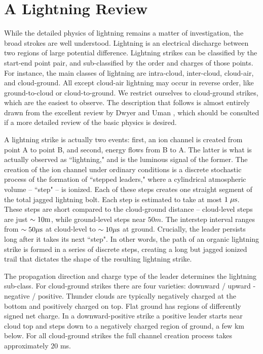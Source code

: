 \documentclass[%
 reprint,
 amsmath,amssymb,
 aps,
]{revtex4-2}
\begin{document}


\section{A Lightning Review} %
\label{sec:a_lightning_review}

    While the detailed physics of lightning remains a matter of investigation, the broad strokes are well understood. Lightning is an electrical discharge between two regions of large potential difference. Lightning strikes can be classified by the start-end point pair, and sub-classified by the order and charges of those points. For instance, the main classes of lightning are intra-cloud, inter-cloud, cloud-air, and cloud-ground. All except cloud-air lightning may occur in reverse order, like ground-to-cloud or cloud-to-ground. We restrict ourselves to cloud-ground strikes, which are the easiest to observe. The description that follows is almost entirely drawn from the excellent review by Dwyer and Uman \citep{DwyerUman2014}, which should be consulted if a more detailed review of the basic physics is desired.

    A lightning strike is actually two events: first, an ion channel is created from point A to point B, and second, energy flows from B to A. The latter is what is actually observed as ``lightning," and is the luminous signal of the former. The creation of the ion channel under ordinary conditions is a discrete stochastic process of the formation of ``stepped leaders," where a cylindrical atmospheric volume -- ``step" -- is ionized. Each of these steps creates one straight segment of the total jagged lightning bolt. Each step is estimated to take at most $1 \; \mu\rm{s}$. These steps are short compared to the cloud-ground distance -- cloud-level steps are just $\sim10 \rm{m}$, while ground-level steps near $50 m$. The interstep interval ranges from $\sim50 \mu\rm{s}$ at cloud-level to $\sim10 \mu\rm{s}$ at ground. Crucially, the leader persists long after it takes its next ``step". In other words, the path of an organic lightning strike is formed in a series of discrete steps, creating a long but jagged ionized trail that dictates the shape of the resulting lightning strike.

    The propagation direction and charge type of the leader determines the lightning sub-class. For cloud-ground strikes there are four varieties: downward / upward - negative / positive. Thunder clouds are typically negatively charged at the bottom and positively charged on top. Flat ground has regions of differently signed net charge. In a downward-positive strike a positive leader starts near cloud top and steps down to a negatively charged region of ground, a few km below. For all cloud-ground strikes the full channel creation process takes approximately $20$ ms.
\end{document}
